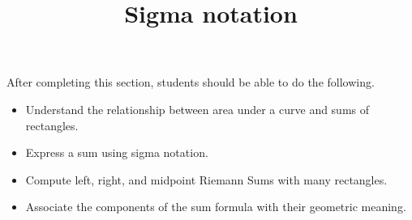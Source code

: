 \documentclass{ximera}
\title{Sigma notation}
\begin{document}
\begin{abstract}
\end{abstract}

\maketitle

\begin{sectionOutcomes}

After completing this section, students should be able to do the following.

\begin{itemize}
\item Understand the relationship between area under a curve and sums of rectangles.
\item Express a sum using sigma notation.
\item Compute left, right, and midpoint Riemann Sums with many rectangles.
\item Associate the components of the sum formula with their geometric meaning.
\end{itemize}

\end{sectionOutcomes}
\end{document}
